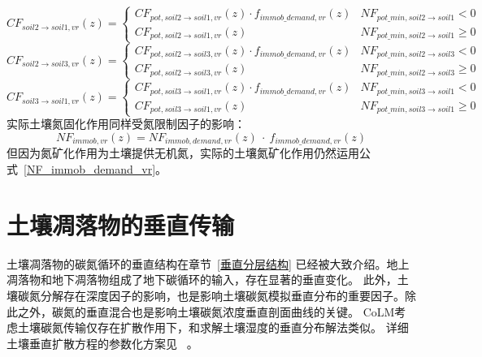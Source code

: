 \begin{equation}
    CF_{soil2 \rightarrow soil1, vr}(z)=\left\{\begin{array}{ll} CF_{pot, soil2 \rightarrow soil1, vr}(z) \cdot f_{immob\_demand, vr}(z) & NF_{pot\_{min, soil2 \rightarrow soil1}} <0 \\ 
    CF_{pot, soil2 \rightarrow soil1, vr}(z) & NF_{pot\_{min, soil2 \rightarrow soil1}} \geqslant 0
   \end{array}\right.
\end{equation}
\begin{equation}
    CF_{soil2 \rightarrow soil3, vr}(z)=\left\{\begin{array}{ll} CF_{pot, soil2 \rightarrow soil3, vr}(z) \cdot f_{immob\_demand, vr}(z) & NF_{pot\_{min, soil2 \rightarrow soil3}} <0 \\ 
    CF_{pot, soil2 \rightarrow soil3, vr}(z) & NF_{pot\_{min, soil2 \rightarrow soil3}} \geqslant 0
   \end{array}\right.
\end{equation}
\begin{equation}
    CF_{soil3 \rightarrow soil1, vr}(z)=\left\{\begin{array}{ll}C F_{pot, soil3 \rightarrow soil1, vr}(z) \cdot f_{immob\_demand, vr}(z) & NF_{pot\_{min, soil3 \rightarrow soil1}} <0 \\ 
    CF_{pot, soil3 \rightarrow soil1, vr}(z) & NF_{pot\_{min, soil3 \rightarrow soil1}} \geqslant 0
   \end{array}\right.
\end{equation}
实际土壤氮固化作用同样受氮限制因子的影响：
\begin{equation}
NF_{immob,vr}(z)=NF_{immob,demand,vr}(z)\ \cdot\ f_{immob\_{demand},vr}(z)
\end{equation}
但因为氮矿化作用为土壤提供无机氮，实际的土壤氮矿化作用仍然运用公式~\eqref{NF_immob_demand_vr}。


\section{土壤凋落物的垂直传输}\label{土壤凋落物的垂直传输}
土壤凋落物的碳氮循环的垂直结构在章节~\ref{垂直分层结构} 已经被大致介绍。地上凋落物和地下凋落物组成了地下碳循环的输入，存在显著的垂直变化。
此外，土壤碳氮分解存在深度因子的影响，也是影响土壤碳氮模拟垂直分布的重要因子。除此之外，碳氮的垂直混合也是影响土壤碳氮浓度垂直剖面曲线的关键。
CoLM考虑土壤碳氮传输仅存在扩散作用下，和求解土壤湿度的垂直分布解法类似。
详细土壤垂直扩散方程的参数化方案见~\citet{koven2009formation,koven2011permafrost,koven2013effect,koven2015permafrost} 。
